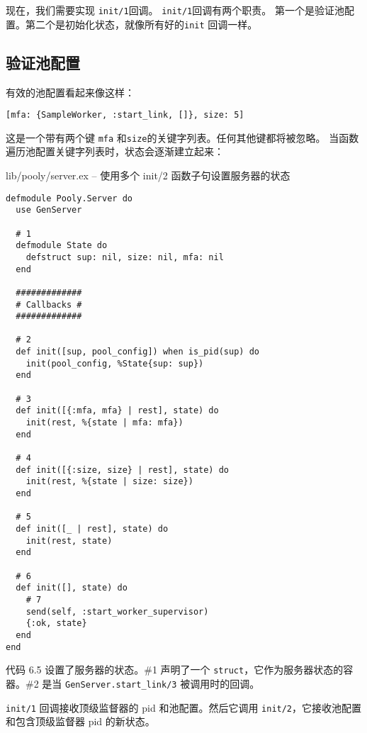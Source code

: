现在，我们需要实现 \texttt{init/1}回调。
\texttt{init/1}回调有两个职责。
第一个是验证池配置。第二个是初始化状态，就像所有好的\texttt{init} 回调一样。

 \subsection{ 验证池配置}

有效的池配置看起来像这样：

\begin{code}{}
\begin{verbatim}
[mfa: {SampleWorker, :start_link, []}, size: 5]
\end{verbatim}
\end{code}

这是一个带有两个键 \texttt{mfa} 和\texttt{size}的关键字列表。任何其他键都将被忽略。
当函数遍历池配置关键字列表时，状态会逐渐建立起来：

\begin{code}{lib/pooly/server.ex -- 使用多个 init/2 函数子句设置服务器的状态}

\begin{verbatim}
defmodule Pooly.Server do
  use GenServer

  # 1
  defmodule State do
    defstruct sup: nil, size: nil, mfa: nil
  end

  #############
  # Callbacks #
  #############

  # 2
  def init([sup, pool_config]) when is_pid(sup) do
    init(pool_config, %State{sup: sup})
  end

  # 3
  def init([{:mfa, mfa} | rest], state) do
    init(rest, %{state | mfa: mfa})
  end

  # 4
  def init([{:size, size} | rest], state) do
    init(rest, %{state | size: size})
  end

  # 5
  def init([_ | rest], state) do
    init(rest, state)
  end

  # 6
  def init([], state) do
    # 7
    send(self, :start_worker_supervisor)
    {:ok, state}
  end
end
\end{verbatim}
\end{code}

代码 6.5 设置了服务器的状态。\#1 声明了一个
\texttt{struct}，它作为服务器状态的容器。\#2 是当
\texttt{GenServer.start\_link/3} 被调用时的回调。

\texttt{init/1} 回调接收顶级监督器的 pid
和池配置。然后它调用
\texttt{init/2}，它接收池配置和包含顶级监督器 pid
的新状态。

